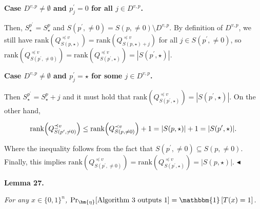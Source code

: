 \par\medskip\noindent\textbf{Case $D^{v,p}\neq\emptyset$ and $p^{\prime}_{j}=0$ for all $j\in D^{v,p}$.}\par




Then, $S^{p^{\prime}}_{\star}=S^{p}_{\star}$ and $S(p^{\prime},\neq 0)=S(p,\neq 0)\setminus D^{v,p}$. By definition of $D^{v,p}$, we still have $\mathrm{rank}(Q^{\preceq v}_{S(p,\star)})=\mathrm{rank}(Q^{\preceq v}_{S(p,\star)+j})$ for all $j\in S(p^{\prime},\neq 0)$, so $\mathrm{rank}(Q^{\preceq v}_{S(p^{\prime},\neq 0)})=\mathrm{rank}(Q^{\preceq v}_{S(p^{\prime},\star)})=|S(p^{\prime},\star)|$.\par





\par\medskip\noindent\textbf{Case $D^{v,p}\neq\emptyset$ and $p^{\prime}_{j}=\star$ for some $j\in D^{v,p}$.}\par




Then $S^{p^{\prime}}_{\star}=S_{\star}^{p}+j$ and it must hold that $\mathrm{rank}(Q^{\preceq v}_{S(p^{\prime},\star)})=|S(p^{\prime},\star)|$. On the other hand,\par


\[\begin{gathered}
\mathrm{rank}\Big{(}Q^{\preceq v}_{S(p^{\prime},\neq 0)}\Big{)}\leq\mathrm{rank}\Big{(}Q^{\prec v}_{S(p,\neq 0)}\Big{)}+1=|S(p,\star)|+1=|S(p^{\prime},\star)|.
\end{gathered}\]


Where the inequality follows from the fact that $S(p^{\prime},\neq 0)\subseteq S(p,\neq 0)$. Finally, this implies $\mathrm{rank}(Q^{\preceq v}_{S(p^{\prime},\neq 0)})=\mathrm{rank}(Q^{\preceq v}_{S(p^{\prime},\star)})=|S(p,\star)|$.
$\blacktriangleleft$\par





\par\medskip\noindent\textbf{
\textbf{Lemma 27}\textbf{.}
}\par



\emph{For any $x\in\{0,1\}^{n}$, $\Pr_{\bm{\eta}}[\textup{Algorithm 3 outputs $1$}]=\mathbbm{1}\left[T(x)=1\right]$.}\par



